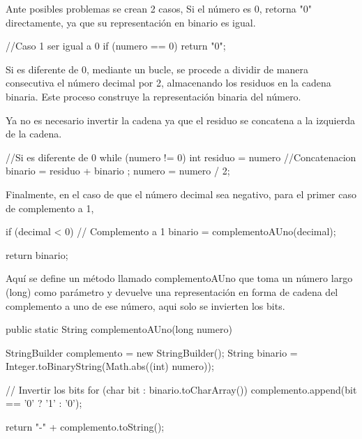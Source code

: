 \documentclass{IEEEcsmag}
\begin{document}
\begin{javaCode}
  public static String decimalABinario(long decimal) {
        String binario = "";
        long numero = Math.abs(decimal); // Obtener el valor absoluto del número
\end{javaCode}


Ante posibles problemas se crean 2 casos,
Si el número es 0, retorna "0" directamente, ya que su representación en binario es igual.

\begin{javaCode}
    //Caso 1 ser igual a 0
    if (numero == 0) {
        return "0";
    }
\end{javaCode}

Si es diferente de 0, mediante un bucle, se procede a dividir de manera consecutiva el número decimal por 2, almacenando los residuos en la cadena binaria. Este proceso construye la representación binaria del número.

Ya no es necesario invertir la cadena ya que el residuo se concatena a la izquierda de la cadena.

\begin{javaCode}
    //Si es diferente de 0 
    while (numero != 0) {
        int residuo = numero %
        //Concatenacion 
        binario = residuo + binario ; 
        numero = numero / 2;
    }
\end{javaCode}

Finalmente, en el caso de que el número decimal sea negativo, para el primer caso de complemento a 1, 

\begin{javaCode}
      if (decimal < 0) {
            // Complemento a 1
            binario = complementoAUno(decimal);
        }

    return binario;
\end{javaCode}

Aquí se define un método llamado complementoAUno que toma un número largo (long) como parámetro y devuelve una representación en forma de cadena del complemento a uno de ese número, aqui solo se invierten los bits.

\begin{javaCode}
        public static String complementoAUno(long numero) {
        StringBuilder complemento = new StringBuilder();
        String binario = Integer.toBinaryString(Math.abs((int) numero));

        // Invertir los bits
        for (char bit : binario.toCharArray()) {
            complemento.append(bit == '0' ? '1' : '0');
        }

        return "-" + complemento.toString();
    }


\end{javaCode}
\end{document}

